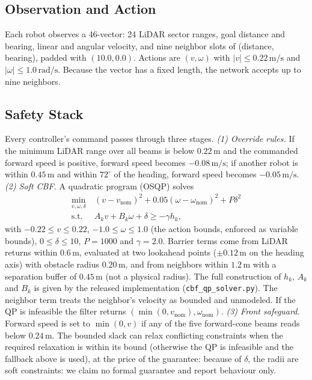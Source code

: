 \documentclass[conference]{IEEEtran}
\newcommand{\si}[1]{\mathrm{#1}}
\begin{document}
\subsection{Observation and Action}
Each robot observes a 46-vector: 24 LiDAR sector ranges, goal distance and
bearing, linear and angular velocity, and nine neighbor slots of (distance,
bearing), padded with $(10.0,0.0)$. Actions are $(v,\omega)$ with
$|v|\le0.22\,\si{m/s}$ and $|\omega|\le1.0\,\si{rad/s}$. Because the vector has
a fixed length, the network accepts up to nine neighbors.

\subsection{Safety Stack}
\label{sec:safety}
Every controller's command passes through three stages.
\emph{(1) Override rules.} If the minimum LiDAR range over all beams is below
$0.22\,\si{m}$ and the commanded forward speed is positive, forward speed
becomes $-0.08\,\si{m/s}$; if another robot is within $0.45\,\si{m}$ and within
$72^\circ$ of the heading, forward speed becomes $-0.05\,\si{m/s}$.
\emph{(2) Soft CBF.} A quadratic program (OSQP) solves
\begin{equation}
\begin{aligned}\min_{v,\omega,\delta}\ &(v-v_{\text{nom}})^2+0.05(\omega-\omega_{\text{nom}})^2+P\delta^2\\ \text{s.t.}\ &A_kv+B_k\omega+\delta\ge-\gamma h_k,\end{aligned}
\end{equation}
with $-0.22\le v\le0.22$, $-1.0\le\omega\le1.0$ (the action bounds, enforced as variable bounds), $0\le\delta\le10$, $P=1000$ and $\gamma=2.0$. Barrier terms come from LiDAR
returns within $0.6\,\si{m}$, evaluated at two lookahead points ($\pm0.12\,\si{m}$
on the heading axis) with obstacle radius $0.20\,\si{m}$, and from neighbors
within $1.2\,\si{m}$ with a separation buffer of $0.45\,\si{m}$ (not a physical radius). The full construction of $h_k$, $A_k$ and $B_k$ is given by the released implementation (\texttt{cbf\_qp\_solver.py}). The neighbor term treats
the neighbor's velocity as bounded and unmodeled. If the QP is infeasible the
filter returns $(\min(0,v_{\text{nom}}),\omega_{\text{nom}})$.
\emph{(3) Front safeguard.} Forward speed is set to $\min(0,v)$ if any of the
five forward-cone beams reads below $0.24\,\si{m}$.
The bounded slack can relax conflicting constraints when the required relaxation is within its bound (otherwise the QP is infeasible and the fallback above is used), at the price of the guarantee: because of $\delta$, the radii are soft constraints: we claim no
formal guarantee and report behaviour only.
\end{document}
